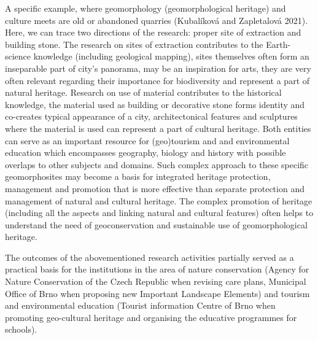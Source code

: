 {A specific example, where geomorphology (geomorphological heritage) and culture meets are old or abandoned quarries (Kubalíková and Zapletalová 2021). Here, we can trace two directions of the research: proper site of extraction and building stone. The research on sites of extraction contributes to the Earth-science knowledge (including geological mapping), sites themselves often form an inseparable part of city’s panorama, may be an inspiration for arts, they are very often relevant regarding their importance for biodiversity and represent a part of natural heritage. Research on use of material contributes to the historical knowledge, the material used as building or decorative stone forms identity and co-creates typical appearance of a city, architectonical features and sculptures where the material is used can represent a part of cultural heritage. Both entities can serve as an important resource for (geo)tourism and and environmental education which encompasses geography, biology and history with possible overlaps to other subjects and domains. Such complex approach to these specific geomorphosites may become a basis for integrated heritage protection, management and promotion that is more effective than separate protection and management of natural and cultural heritage. The complex promotion of heritage (including all the aspects and linking natural and cultural features) often helps to understand the need of geoconservation and sustainable use of geomorphological heritage.

The outcomes of the abovementioned research activities partially served as a practical basis for the institutions in the area of nature conservation (Agency for Nature Conservation of the Czech Republic when revising care plans, Municipal Office of Brno when proposing new Important Landscape Elements) and tourism and environmental education (Tourist information Centre of Brno when promoting geo-cultural heritage and organising the educative programmes for schools).
}
